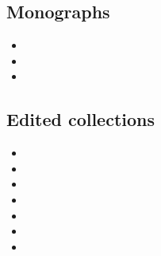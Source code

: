 \documentclass[output=paper, colorlinks,citecolor=brown]{langscibook}
\begin{document}
\subsection*{Monographs}
\begin{itemize}[label={},itemsep=\bibitemsep,leftmargin=\bibhang,itemindent=-\parindent,noitemsep]\sloppy
    \item {}
    \item {}
    \item {}
\end{itemize}

\subsection*{Edited collections}
\begin{itemize}[label={},itemsep=\bibitemsep,leftmargin=\bibhang,itemindent=-\parindent,noitemsep]\sloppy
    \item {}
    \item {}
    \item {}
    \item {}
    \item {}
    \item {}
    \item {}
\end{itemize}
\end{document}
